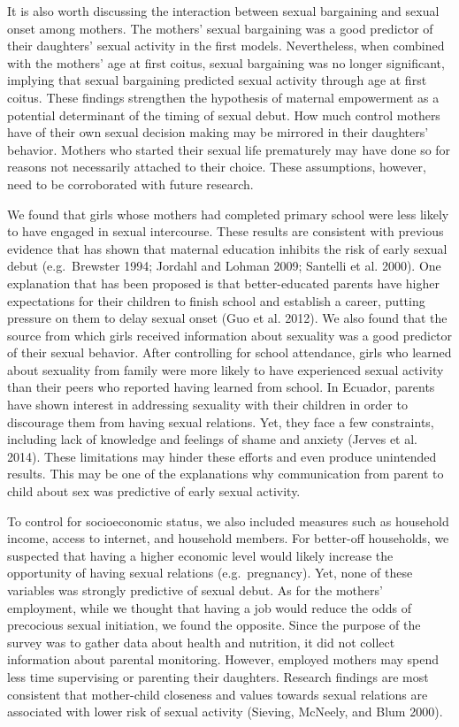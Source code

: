 \documentclass[
]{article}
\begin{document}
It is also worth discussing the interaction between sexual bargaining
and sexual onset among mothers. The mothers' sexual bargaining was a
good predictor of their daughters' sexual activity in the first models.
Nevertheless, when combined with the mothers' age at first coitus,
sexual bargaining was no longer significant, implying that sexual
bargaining predicted sexual activity through age at first coitus. These
findings strengthen the hypothesis of maternal empowerment as a
potential determinant of the timing of sexual debut. How much control
mothers have of their own sexual decision making may be mirrored in
their daughters' behavior. Mothers who started their sexual life
prematurely may have done so for reasons not necessarily attached to
their choice. These assumptions, however, need to be corroborated with
future research.

We found that girls whose mothers had completed primary school were less
likely to have engaged in sexual intercourse. These results are
consistent with previous evidence that has shown that maternal education
inhibits the risk of early sexual debut (e.g.~Brewster 1994; Jordahl and
Lohman 2009; Santelli et al. 2000). One explanation that has been
proposed is that better-educated parents have higher expectations for
their children to finish school and establish a career, putting pressure
on them to delay sexual onset (Guo et al. 2012). We also found that the
source from which girls received information about sexuality was a good
predictor of their sexual behavior. After controlling for school
attendance, girls who learned about sexuality from family were more
likely to have experienced sexual activity than their peers who reported
having learned from school. In Ecuador, parents have shown interest in
addressing sexuality with their children in order to discourage them
from having sexual relations. Yet, they face a few constraints,
including lack of knowledge and feelings of shame and anxiety (Jerves et
al. 2014). These limitations may hinder these efforts and even produce
unintended results. This may be one of the explanations why
communication from parent to child about sex was predictive of early
sexual activity.

To control for socioeconomic status, we also included measures such as
household income, access to internet, and household members. For
better-off households, we suspected that having a higher economic level
would likely increase the opportunity of having sexual relations
(e.g.~pregnancy). Yet, none of these variables was strongly predictive
of sexual debut. As for the mothers' employment, while we thought that
having a job would reduce the odds of precocious sexual initiation, we
found the opposite. Since the purpose of the survey was to gather data
about health and nutrition, it did not collect information about
parental monitoring. However, employed mothers may spend less time
supervising or parenting their daughters. Research findings are most
consistent that mother-child closeness and values towards sexual
relations are associated with lower risk of sexual activity (Sieving,
McNeely, and Blum 2000).
\end{document}
